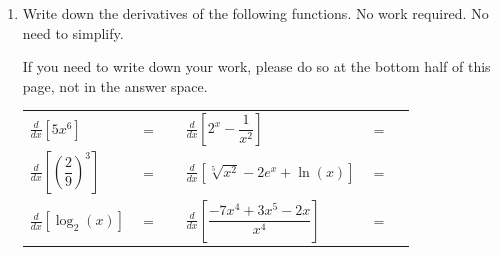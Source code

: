 \documentclass[11pt]{article}
\begin{document}
\begin{enumerate}
A correct final answer receives full credit. Nevertheless, you are encouraged to write down the steps so that you will be able to receive partial credit if you final answer is not fully correct. There's no need to simplify your final answer

\begin{enumerate}
\item $f(x) = e^x\cdot\dfrac{x^2}{x^3 + 2}$

\vfill

\item $g(x) = \sqrt{4x^2+5}$

\vfill 
\end{enumerate}

\newpage

\item Write down the derivatives of the following functions. No work required. No need to simplify.

If you need to write down your work, please do so at the bottom half of this page, not in the answer space.

\begin{center}
        \begin{tabular}{l c r l c r}
            $\displaystyle\frac{d}{dx}\left[ 5x^6 \right]$ & $=$ & \rule[-8pt]{1.5in}{0.4pt} &
            \vspace{2in}
            $\displaystyle\frac{d}{dx}\left[ 2^x-\dfrac{1}{x^2} \right]$ & $=$ & \rule[-8pt]{1.5in}{0.4pt}\\[0.3in]
            \vspace{2in}
            $\displaystyle\frac{d}{dx}\left[ \left(\dfrac{2}{9}\right)^3 \right]$ & $=$ & \rule[-8pt]{1.5in}{0.4pt} & 
            $\displaystyle\frac{d}{dx}\left[ \sqrt[5]{x^2}-2e^x+\ln(x)\right]$ & $=$ & \rule[-8pt]{1.5in}{0.4pt}\\[0.3in]
            $\displaystyle\frac{d}{dx}\left[ \log_2(x) \right]$ & $=$ & \rule[-8pt]{1.5in}{0.4pt}&
            $\displaystyle\frac{d}{dx}\left[ \dfrac{-7x^4+3x^5-2x}{x^4} \right]$ & $=$ & \rule[-8pt]{1.5in}{0.4pt}\\[0.3in]
        \end{tabular} 
\end{center}


\end{enumerate}
\end{document}
